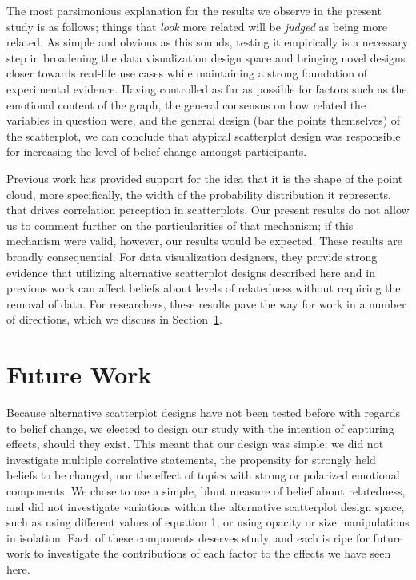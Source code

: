 \documentclass[manuscript,screen,review,anonymous]{acmart}
\begin{document}
The most parsimonious explanation for the results we observe in the
present study is as follows; things that \emph{look} more related will
be \emph{judged} as being more related. As simple and obvious as this
sounds, testing it empirically is a necessary step in broadening the
data visualization design space and bringing novel designs closer
towards real-life use cases while maintaining a strong foundation of
experimental evidence. Having controlled as far as possible for factors
such as the emotional content of the graph, the general consensus on how
related the variables in question were, and the general design (bar the
points themselves) of the scatterplot, we can conclude that atypical
scatterplot design was responsible for increasing the level of belief
change amongst participants.

Previous work has provided support for the idea that it is the shape of
the point cloud, more specifically, the width of the probability
distribution it represents, that drives correlation perception in
scatterplots. Our present results do not allow us to comment further on
the particularities of that mechanism; if this mechanism were valid,
however, our results would be expected. These results are broadly
consequential. For data visualization designers, they provide strong
evidence that utilizing alternative scatterplot designs described here
and in previous work can affect beliefs about levels of relatedness
without requiring the removal of data. For researchers, these results
pave the way for work in a number of directions, which we discuss in
Section~\ref{sec-future-work}.

\section{Future Work}\label{sec-future-work}

Because alternative scatterplot designs have not been tested before with
regards to belief change, we elected to design our study with the
intention of capturing effects, should they exist. This meant that our
design was simple; we did not investigate multiple correlative
statements, the propensity for strongly held beliefs to be changed, nor
the effect of topics with strong or polarized emotional components. We
chose to use a simple, blunt measure of belief about relatedness, and
did not investigate variations within the alternative scatterplot design
space, such as using different values of equation 1, or using opacity or
size manipulations in isolation. Each of these components deserves
study, and each is ripe for future work to investigate the contributions
of each factor to the effects we have seen here.
\end{document}
